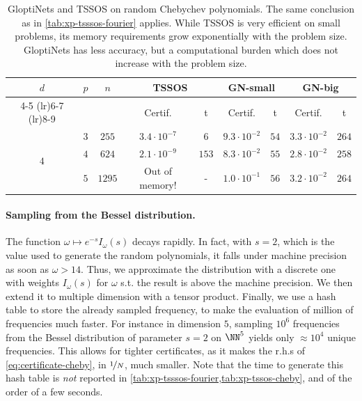 \documentclass{article}
\begin{document}
\begin{table}
  \caption{GloptiNets and TSSOS on random Chebychev polynomials. The same conclusion as in \cref{tab:xp-tsssos-fourier} applies. While TSSOS is very efficient on small problems, its memory requirements grow exponentially with the problem size. GloptiNets has less accuracy, but a computational burden which does not increase with the problem size.}
  \label{tab:xp-tssos-cheby}
  \centering
  \begin{tabular}{*{9}{c}}
    \toprule
    \multirow{3}{*}{$d$}         &
    \multirow{3}{*}{$p$}         &
    \multirow{3}{*}{$n$}         &

    \multicolumn{2}{c}{TSSOS}    &
    \multicolumn{2}{c}{GN-small} & \multicolumn{2}{c}{GN-big}                                                                                                   \\
    \cmidrule(lr){4-5}
    \cmidrule(lr){6-7}
    \cmidrule(lr){8-9}


                                 &                            &        & Certif.             & t     &
    Certif.                      & t                          &
    Certif.                      & t
    \\
    \midrule
    \multirow{3}{*}{$4$}         & $3$                        & $255$  & $3.4 \cdot 10^{-7}$ & $6$   & $9.3 \cdot 10^{-2}$ & $54$ & $3.3 \cdot 10^{-2}$ & $264$ \\
                                 & $4$                        & $624$  & $2.1 \cdot 10^{-9}$ & $153$ & $8.3 \cdot 10^{-2}$ & $55$ & $2.8 \cdot 10^{-2}$ & $258$ \\
                                 & $5$                        & $1295$ & Out of memory!      & -     & $1.0 \cdot 10^{-1}$ & $56$ & $3.2 \cdot 10^{-2}$ & $264$ \\

    \bottomrule
  \end{tabular}
\end{table}

\paragraph{Sampling from the Bessel distribution.}
The function $\omega \mapsto e^{-s} I_{\omega}(s)$ decays rapidly. In fact, with $s = 2$, which is the value used to generate the random polynomials, it falls under machine precision as soon as $\omega > 14$. Thus, we approximate the distribution with a discrete one with weights $I_\omega(s)$ for $\omega$ s.t. the result is above the machine precision. We then extend it to multiple dimension with a tensor product. Finally, we use a hash table to store the already sampled frequency, to make the evaluation of million of frequencies much faster. For instance in dimension $5$, sampling $10^6$ frequencies from the Bessel distribution of parameter $s = 2$ on $\NN^5$ yields only $\approx 10^4$ unique frequencies. This allows for tighter certificates, as it makes the r.h.s of \cref{eq:certificate-cheby}, in $\nicefrac{1}{N}$, much smaller. Note that the time to generate this hash table is \emph{not} reported in \cref{tab:xp-tsssos-fourier,tab:xp-tssos-cheby}, and of the order of a few seconds.
\end{document}
